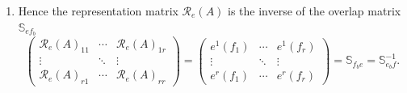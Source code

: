 \documentclass[aps,preprint]{revtex4}
\begin{document}
\begin{enumerate}
\begin{enumerate}
\begin{equation}
\begin{array}{ccc}
e^{r}\left( f_{1}\right) & \cdots & e^{r}\left( f_{r}\right)%
\end{array}%
\right)
\end{equation}%
and its inverse $\mathbb{S}_{f_{b}e}^{-1}=\mathbb{S}_{ef_{b}}$ by 
\begin{equation}
\mathbb{S}_{fe_{b}}^{-1}=\mathbb{S}_{e_{b}f}=\left[ \left( \overset{}{%
\boldsymbol{e}}\right) \right] \left( \overset{}{\boldsymbol{f}_{b}}\right)
^{t}=\left[ \left( 
\begin{array}{c}
e_{1} \\ 
\vdots \\ 
e_{r}%
\end{array}%
\right) \right] \left( 
\begin{array}{ccc}
f^{1} & \cdots & f^{r}%
\end{array}%
\right) =\left( 
\begin{array}{ccc}
e_{1}\left( f^{1}\right) & \cdots & e_{1}\left( f^{r}\right) \\ 
\vdots & \ddots & \vdots \\ 
e_{r}\left( f^{1}\right) & \cdots & e_{r}\left( f^{r}\right)%
\end{array}%
\right) =\left( 
\begin{array}{ccc}
f^{1}\left( e_{1}\right) & \cdots & f^{1}\left( e_{r}\right) \\ 
\vdots & \ddots & \vdots \\ 
f^{r}\left( e_{1}\right) & \cdots & f^{r}\left( e_{r}\right)%
\end{array}%
\right) .
\end{equation}

\item Hence the representation matrix $\mathcal{R}_{e}\left( A\right) $ is
the inverse of the overlap matrix $\mathbb{S}_{ef_{b}}$ 
\begin{equation}
\left( 
\begin{array}{ccc}
\mathcal{R}_{e}\left( A\right) _{11} & \cdots & \mathcal{R}_{e}\left(
A\right) _{1r} \\ 
\vdots & \ddots & \vdots \\ 
\mathcal{R}_{e}\left( A\right) _{r1} & \cdots & \mathcal{R}_{e}\left(
A\right) _{rr}%
\end{array}%
\right) =\left( 
\begin{array}{ccc}
e^{1}\left( f_{1}\right) & \cdots & e^{1}\left( f_{r}\right) \\ 
\vdots & \ddots & \vdots \\ 
e^{r}\left( f_{1}\right) & \cdots & e^{r}\left( f_{r}\right)%
\end{array}%
\right) =\mathbb{S}_{f_{b}e}=\mathbb{S}_{e_{b}f}^{-1}.
\end{equation}


\end{enumerate}
\end{enumerate}
\end{document}
